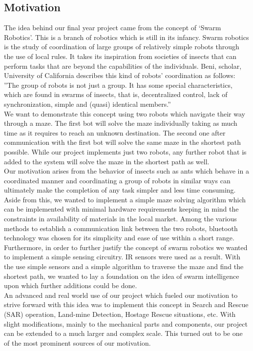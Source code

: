 \subsection{Motivation}
The idea behind our final year project came from the concept of ‘Swarm Robotics’. This
is a branch of robotics which is still in its infancy. Swarm robotics is the study of coordination of large
groups of relatively simple robots through the use of local rules. It takes its
inspiration from societies of insects that can perform tasks that are beyond the capabilities of
the individuals. Beni\cite{beni}, scholar, University of California describes this kind of robots’ coordination as follows:
”The group of robots is not just a group. It has some special characteristics, which are
found in swarms of insects, that is, decentralized control, lack of synchronization, simple
and (quasi) identical members.”\\
We want to demonstrate this concept using two robots which navigate their way through a
maze. The first bot will solve the maze individually taking as much time as it requires to reach an
unknown destination. The second one after communication with the first bot will solve the same maze
in the shortest path possible. While our project implements just two robots, any further robot that is
added to the system will solve the maze in the shortest path as well.\\
Our motivation arises from the behavior of insects such as ants which behave in a coordinated manner
and coordinating a group of robots in similar ways can ultimately make the
completion of any task simpler and less time consuming. Aside from this, we wanted to
implement a simple maze solving algorithm which can be implemented with minimal hardware
requirements keeping in mind the constraints in availability of materials in the local market.
Among the various methods to establish a communication link between the two robots, bluetooth
technology was chosen for its simplicity and ease of use within a short range.\\
Furthermore, in order to further justify the concept of swarm robotics we wanted to implement a simple
sensing circuitry. IR sensors were used as a result. With the use simple sensors and a simple algorithm
to traverse the maze and find the shortest path, we wanted to lay a foundation on the idea of swarm
intelligence upon which further additions could be done.\\
An advanced and real world use of our project which fueled our motivation to strive forward
with this idea was to implement this concept in Search and Rescue (SAR) operation, Land-mine
Detection, Hostage Rescue situations, etc. With slight modifications, mainly to the
mechanical parts and components, our project can be extended to a much larger and complex scale.
This turned out to be one of the most prominent sources of our motivation.